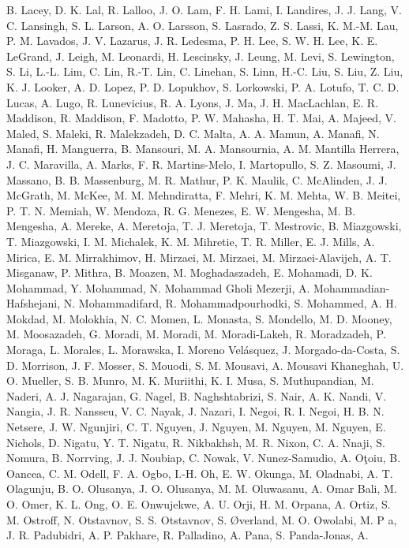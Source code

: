 \documentclass[
  letterpaper,
  DIV=11,
  numbers=noendperiod]{scrartcl}
\newlength{\cslhangindent}
\newenvironment{CSLReferences}[2] %
 {\begin{list}{}{%
  \setlength{\itemindent}{0pt}
  \setlength{\leftmargin}{0pt}
  \setlength{\parsep}{0pt}
  \ifodd #1
   \setlength{\leftmargin}{\cslhangindent}
   \setlength{\itemindent}{-1\cslhangindent}
  \fi
  \setlength{\itemsep}{#2\baselineskip}}}
 {\end{list}}
\begin{document}
\begin{CSLReferences}{0}{0}
{B. Lacey, D. K. Lal, R. Lalloo, J. O. Lam, F. H. Lami, I. Landires, J.
J. Lang, V. C. Lansingh, S. L. Larson, A. O. Larsson, S. Lasrado, Z. S.
Lassi, K. M.-M. Lau, P. M. Lavados, J. V. Lazarus, J. R. Ledesma, P. H.
Lee, S. W. H. Lee, K. E. LeGrand, J. Leigh, M. Leonardi, H. Lescinsky,
J. Leung, M. Levi, S. Lewington, S. Li, L.-L. Lim, C. Lin, R.-T. Lin, C.
Linehan, S. Linn, H.-C. Liu, S. Liu, Z. Liu, K. J. Looker, A. D. Lopez,
P. D. Lopukhov, S. Lorkowski, P. A. Lotufo, T. C. D. Lucas, A. Lugo, R.
Lunevicius, R. A. Lyons, J. Ma, J. H. MacLachlan, E. R. Maddison, R.
Maddison, F. Madotto, P. W. Mahasha, H. T. Mai, A. Majeed, V. Maled, S.
Maleki, R. Malekzadeh, D. C. Malta, A. A. Mamun, A. Manafi, N. Manafi,
H. Manguerra, B. Mansouri, M. A. Mansournia, A. M. Mantilla Herrera, J.
C. Maravilla, A. Marks, F. R. Martins-Melo, I. Martopullo, S. Z.
Masoumi, J. Massano, B. B. Massenburg, M. R. Mathur, P. K. Maulik, C.
McAlinden, J. J. McGrath, M. McKee, M. M. Mehndiratta, F. Mehri, K. M.
Mehta, W. B. Meitei, P. T. N. Memiah, W. Mendoza, R. G. Menezes, E. W.
Mengesha, M. B. Mengesha, A. Mereke, A. Meretoja, T. J. Meretoja, T.
Mestrovic, B. Miazgowski, T. Miazgowski, I. M. Michalek, K. M. Mihretie,
T. R. Miller, E. J. Mills, A. Mirica, E. M. Mirrakhimov, H. Mirzaei, M.
Mirzaei, M. Mirzaei-Alavijeh, A. T. Misganaw, P. Mithra, B. Moazen, M.
Moghadaszadeh, E. Mohamadi, D. K. Mohammad, Y. Mohammad, N. Mohammad
Gholi Mezerji, A. Mohammadian-Hafshejani, N. Mohammadifard, R.
Mohammadpourhodki, S. Mohammed, A. H. Mokdad, M. Molokhia, N. C. Momen,
L. Monasta, S. Mondello, M. D. Mooney, M. Moosazadeh, G. Moradi, M.
Moradi, M. Moradi-Lakeh, R. Moradzadeh, P. Moraga, L. Morales, L.
Morawska, I. Moreno Velásquez, J. Morgado-da-Costa, S. D. Morrison, J.
F. Mosser, S. Mouodi, S. M. Mousavi, A. Mousavi Khaneghah, U. O.
Mueller, S. B. Munro, M. K. Muriithi, K. I. Musa, S. Muthupandian, M.
Naderi, A. J. Nagarajan, G. Nagel, B. Naghshtabrizi, S. Nair, A. K.
Nandi, V. Nangia, J. R. Nansseu, V. C. Nayak, J. Nazari, I. Negoi, R. I.
Negoi, H. B. N. Netsere, J. W. Ngunjiri, C. T. Nguyen, J. Nguyen, M.
Nguyen, M. Nguyen, E. Nichols, D. Nigatu, Y. T. Nigatu, R. Nikbakhsh, M.
R. Nixon, C. A. Nnaji, S. Nomura, B. Norrving, J. J. Noubiap, C. Nowak,
V. Nunez-Samudio, A. Oţoiu, B. Oancea, C. M. Odell, F. A. Ogbo, I.-H.
Oh, E. W. Okunga, M. Oladnabi, A. T. Olagunju, B. O. Olusanya, J. O.
Olusanya, M. M. Oluwasanu, A. Omar Bali, M. O. Omer, K. L. Ong, O. E.
Onwujekwe, A. U. Orji, H. M. Orpana, A. Ortiz, S. M. Ostroff, N.
Otstavnov, S. S. Otstavnov, S. Øverland, M. O. Owolabi, M. P a, J. R.
Padubidri, A. P. Pakhare, R. Palladino, A. Pana, S. Panda-Jonas, A.
}
\end{CSLReferences}
\end{document}

